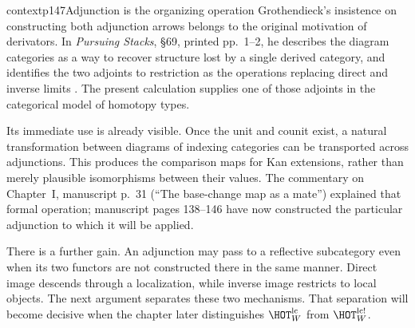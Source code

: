 \begin{dcomment}{context}{p147}{Adjunction is the organizing operation}
Grothendieck's insistence on constructing both adjunction arrows belongs to the original motivation of derivators. In \emph{Pursuing Stacks}, \S69, printed pp.~1--2, he describes the diagram categories as a way to recover structure lost by a single derived category, and identifies the two adjoints to restriction as the operations replacing direct and inverse limits \citep{Grothendieck1983}. The present calculation supplies one of those adjoints in the categorical model of homotopy types.

Its immediate use is already visible. Once the unit and counit exist, a natural transformation between diagrams of indexing categories can be transported across adjunctions. This produces the comparison maps for Kan extensions, rather than merely plausible isomorphisms between their values. The commentary on Chapter~I, manuscript p.~31 (``The base-change map as a mate'') explained that formal operation; manuscript pages 138--146 have now constructed the particular adjunction to which it will be applied.

There is a further gain. An adjunction may pass to a reflective subcategory even when its two functors are not constructed there in the same manner. Direct image descends through a localization, while inverse image restricts to local objects. The next argument separates these two mechanisms. That separation will become decisive when the chapter later distinguishes $\HOT_W^{\mathrm{lc}}$ from $\HOT_W^{\mathrm{lc}!}$.
\end{dcomment}

